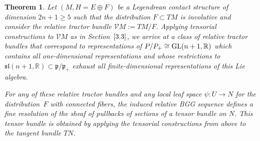 \documentclass[10pt,a4paper]{amsart}
\numberwithin{equation}{section}
\newtheorem{Theorem}{Theorem}[section]
\def\frak{\mathfrak}
\def\Bbb{\mathbb}
\def\Cal{\mathcal}
\begin{document}
\begin{Theorem}\label{thm3.4}
 Let $(M,H=E\oplus F)$ be a Legendrean contact structure of dimension ${2n+1\geq 5}$
 such that the distribution $F\subset TM$ is involutive and consider the relative
 tractor bundle $\Cal VM:=TM/F$. Applying tensorial constructions to $\Cal VM$ as in
 Section~$\ref{3.3}$, we arrive at a class of relative tractor bundles that correspond to
 representations of $P/P_+\cong {\rm GL}(n+1,\Bbb R)$ which contains all one-dimensional
 representations and whose restrictions to
 $\frak{sl}(n+1,\Bbb R)\subset\frak p/\frak p_+$ exhaust all finite-dimensional
 representations of this Lie algebra.

 For any of these relative tractor bundles and any local leaf space $\psi\colon U\to N$
 for the distribution~$F$ with connected fibers, the induced relative BGG sequence
 defines a fine resolution of the sheaf of pullbacks of sections of a tensor bundle
 on $N$. This tensor bundle is obtained by applying the tensorial constructions from
 above to the tangent bundle $TN$.
\end{Theorem}
\end{document}
